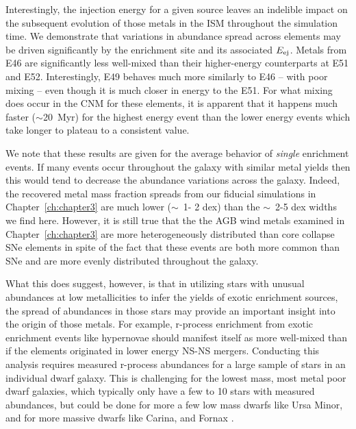Interestingly, the injection energy for a given source leaves an indelible impact on the subsequent evolution of those metals in the ISM throughout the simulation time. We demonstrate that variations in abundance spread across elements may be driven significantly by the enrichment site and its associated $E_{\rm ej}$. Metals from \runone E46 are significantly less well-mixed than their higher-energy counterparts at \runone E51 and \runone E52. Interestingly, \runone E49 behaves much more similarly to \runone E46 -- with poor mixing -- even though it is much closer in energy to the \runone E51. For what mixing does occur in the CNM for these elements, it is apparent that it happens much faster ($\sim$20~Myr) for the highest energy event than the lower energy events which take longer to plateau to a consistent value.

We note that these results are given for the average behavior of \textit{single} enrichment events. If many events occur throughout the galaxy with similar metal yields then this would tend to decrease the abundance variations across the galaxy. Indeed, the recovered metal mass fraction spreads from our fiducial simulations in Chapter~\ref{ch:chapter3} are much lower ($\sim$~1- 2 dex) than the $\sim$~2-5 dex widths we find here. However, it is still true that the the AGB wind metals examined in Chapter~\ref{ch:chapter3} are more heterogeneously distributed than core collapse SNe elements in spite of the fact that these events are both more common than SNe and are more evenly distributed throughout the galaxy.

What this does suggest, however, is that in utilizing stars with unusual abundances at low metallicities to infer the yields of exotic enrichment sources, the spread of abundances in those stars may provide an important insight into the origin of those metals. For example, r-process enrichment from exotic enrichment events like hypernovae should manifest itself as more well-mixed than if the elements originated in lower energy NS-NS mergers. Conducting this analysis requires measured r-process abundances for a large sample of stars in an individual dwarf galaxy. This is challenging for the lowest mass, most metal poor dwarf galaxies, which typically only have a few to 10 stars with measured abundances, but could be done for more a few low mass dwarfs like Ursa Minor, and for more massive dwarfs like Carina, and Fornax \citep{Suda2017}.


